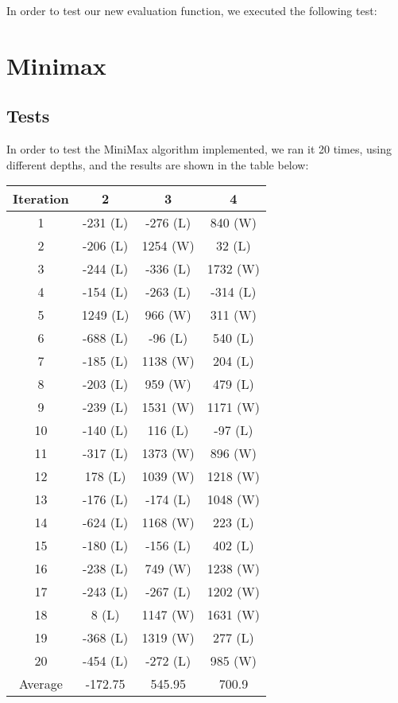 \documentclass{article}
\begin{document}
In order to test our new evaluation function, we executed the following test:

\section{Minimax}

\subsection{Tests}

In order to test the MiniMax algorithm implemented, we ran it 20 times, using different depths, and the results are shown in the table below: \\

\begin{center}
  \begin{tabular}{||c||c|c|c||}
    \hline
    Iteration & 2 & 3 & 4 \\ [0.5ex]
    \hline\hline
    1 & -231 (L) & -276 (L) &  840 (W) \\
    \hline
    2 & -206 (L) & 1254 (W) &   32 (L) \\
    \hline
    3 & -244 (L) & -336 (L) & 1732 (W) \\
    \hline
    4 & -154 (L) & -263 (L) & -314 (L) \\
    \hline
    5 & 1249 (L) &  966 (W) &  311 (W) \\
    \hline
    6 & -688 (L) &  -96 (L) &  540 (L) \\
    \hline
    7 & -185 (L) & 1138 (W) &  204 (L) \\
    \hline
    8 & -203 (L) &  959 (W) &  479 (L) \\
    \hline
    9 & -239 (L) & 1531 (W) & 1171 (W) \\
    \hline
    10 & -140 (L) &  116 (L) &  -97 (L) \\
    \hline
    11 & -317 (L) & 1373 (W) &  896 (W) \\
    \hline
    12 &  178 (L) & 1039 (W) & 1218 (W) \\
    \hline
    13 & -176 (L) & -174 (L) & 1048 (W) \\
    \hline
    14 & -624 (L) & 1168 (W) &  223 (L) \\
    \hline
    15 & -180 (L) & -156 (L) &  402 (L) \\
    \hline
    16 & -238 (L) &  749 (W) & 1238 (W) \\
    \hline
    17 & -243 (L) & -267 (L) & 1202 (W) \\
    \hline
    18 &    8 (L) & 1147 (W) & 1631 (W) \\
    \hline
    19 & -368 (L) & 1319 (W) &  277 (L) \\
    \hline
    20 & -454 (L) & -272 (L) &  985 (W) \\
    \hline\hline
    Average &  -172.75 &  545.95 &  700.9 \\
    \hline
  \end{tabular}
\end{center}
\end{document}
